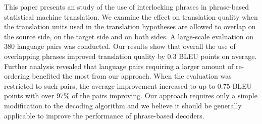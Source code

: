 This paper presents an study of the use of interlocking phrases in phrase-based statistical machine translation.  We examine the effect on translation quality when the translation units used in the translation hypotheses are allowed to overlap on the source side, on the target side and on both sides. A large-scale evaluation on 380 language pairs was conducted. Our results show that overall the use of overlapping phrases improved translation quality by 0.3 BLEU points on average. Further analysis revealed that language pairs requiring a larger amount of re-ordering benefited the most from our approach. When the evaluation was restricted to such pairs, the average improvement increased to up to 0.75 BLEU points with over 97\% of the pairs improving. Our approach requires only a simple modification to the decoding algorithm and we believe it should be generally applicable to improve the performance of phrase-based decoders.
